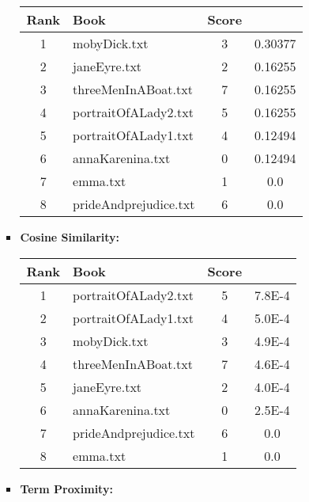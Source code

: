 \documentclass[a4paper,11pt,oneside]{book}
\begin{document}
\begin{enumerate}
\begin{enumerate}
\begin{itemize}
										\begin{tabular}{clcc}
											\toprule
												\textbf{Rank} & \textbf{Book} & \textbf{Score}\\
											\hline
												1	&	mobyDick.txt	&	3	&	0.30377	\\
												2	&	janeEyre.txt	&	2	&	0.16255	\\
												3	&	threeMenInABoat.txt	&	7	&	0.16255	\\
												4	&	portraitOfALady2.txt	&	5	&	0.16255	\\
												5	&	portraitOfALady1.txt	&	4	&	0.12494	\\
												6	&	annaKarenina.txt	&	0	&	0.12494	\\
												7	&	emma.txt	&	1	&	0.0	\\
												8	&	prideAndprejudice.txt	&	6	&	0.0	\\
											\bottomrule
										\end{tabular}\newline
							\item \textbf{Cosine Similarity:}
							
										\begin{tabular}{clcc}
											\toprule
												\textbf{Rank} & \textbf{Book} & \textbf{Score}\\
											\hline
												1	&	portraitOfALady2.txt	&	5	&	7.8E-4	\\
												2	&	portraitOfALady1.txt	&	4	&	5.0E-4	\\
												3	&	mobyDick.txt	&	3	&	4.9E-4	\\
												4	&	threeMenInABoat.txt	&	7	&	4.6E-4	\\
												5	&	janeEyre.txt	&	2	&	4.0E-4	\\
												6	&	annaKarenina.txt	&	0	&	2.5E-4	\\
												7	&	prideAndprejudice.txt	&	6	&	0.0	\\
												8	&	emma.txt	&	1	&	0.0	\\
											\bottomrule
										\end{tabular}\newline
							\item \textbf{Term Proximity:}
							

\end{itemize}
\end{enumerate}
\end{enumerate}
\end{document}
